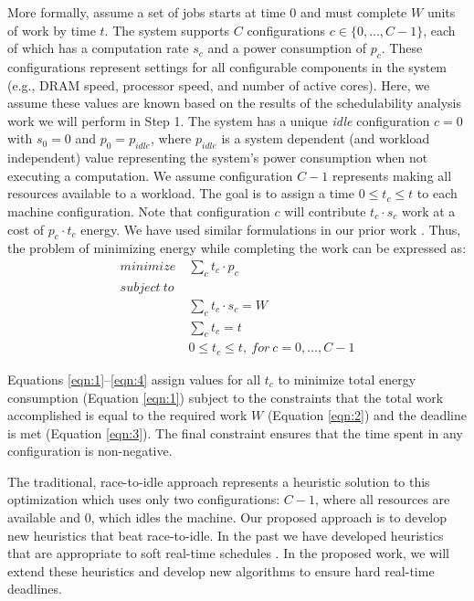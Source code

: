 More formally, assume a set of jobs starts at time $0$ and must
complete $W$ units of work by time $t$. The system supports $C$
configurations $c \in \{0,\dots,C-1\}$, each of which has a
computation rate $s_c$ and a power consumption of $p_c$. These
configurations represent settings for all configurable components in
the system (e.g., DRAM speed, processor speed, and number of active
cores).  Here, we assume these values are known based on the results
of the schedulability analysis work we will perform in Step 1. The
system has a unique \emph{idle} configuration $c = 0$ with $s_0 = 0$
and $p_0 = p_{idle}$, where $p_{idle}$ is a system dependent (and
workload independent) value representing the system's power
consumption when not executing a computation. We assume configuration
$C-1$ represents making all resources available to a workload.  The
goal is to assign a time $0 \le t_c \le t$ to each machine
configuration.  Note that configuration $c$ will contribute $t_c \cdot
s_c$ work at a cost of $p_c \cdot t_c$ energy.  We have used similar
formulations in our prior work \cite{LEO,POET,kim-cpsna}. Thus, the
problem of minimizing energy while completing the work can be
expressed as:
\begin{align*}
minimize~& \sum_c t_c \cdot p_c \tag{1} \label{eqn:1}\\
subject~to~\\
& \sum_c t_c \cdot s_c = W \tag{2} \label{eqn:2}\\
& \sum_c t_c = t \tag{3} \label{eqn:3}\\
& 0 \le t_c \le t,~for~c = 0,\dots,C-1 \tag{4} \label{eqn:4}
\end{align*}

Equations \ref{eqn:1}--\ref{eqn:4} assign values for all $t_c$ to
minimize total energy consumption (Equation \ref{eqn:1}) subject to the
constraints that the total work accomplished is equal to the required
work $W$ (Equation \ref{eqn:2}) and the deadline is met (Equation
\ref{eqn:3}). The final constraint ensures that the time spent in any
configuration is non-negative.

The traditional, race-to-idle approach represents a heuristic solution
to this optimization which uses only two configurations: $C-1$, where
all resources are available and $0$, which idles the machine.  Our
proposed approach is to develop new heuristics that beat race-to-idle.
In the past we have developed heuristics that are appropriate to soft
real-time schedules \cite{POET,EMSOFT}.  In the proposed work, we will
extend these heuristics and develop new algorithms to ensure hard
real-time deadlines.  

